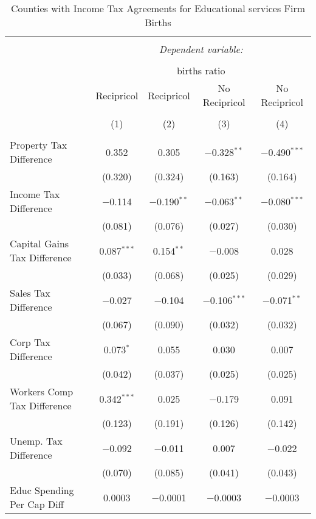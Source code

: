 
\begin{table}[!htbp] \centering 
  \caption{Counties with Income Tax Agreements for  Educational services Firm Births} 
  \label{61rd} 
\begin{tabular}{@{\extracolsep{5pt}}lcccc} 
\\[-1.8ex]\hline 
\hline \\[-1.8ex] 
 & \multicolumn{4}{c}{\textit{Dependent variable:}} \\ 
\cline{2-5} 
\\[-1.8ex] & \multicolumn{4}{c}{births ratio} \\ 
 & Recipricol & Recipricol & No Recipricol & No Recipricol \\ 
\\[-1.8ex] & (1) & (2) & (3) & (4)\\ 
\hline \\[-1.8ex] 
 Property Tax Difference & 0.352 & 0.305 & $-$0.328$^{**}$ & $-$0.490$^{***}$ \\ 
  & (0.320) & (0.324) & (0.163) & (0.164) \\ 
  Income Tax Difference & $-$0.114 & $-$0.190$^{**}$ & $-$0.063$^{**}$ & $-$0.080$^{***}$ \\ 
  & (0.081) & (0.076) & (0.027) & (0.030) \\ 
  Capital Gains Tax Difference & 0.087$^{***}$ & 0.154$^{**}$ & $-$0.008 & 0.028 \\ 
  & (0.033) & (0.068) & (0.025) & (0.029) \\ 
  Sales Tax Difference & $-$0.027 & $-$0.104 & $-$0.106$^{***}$ & $-$0.071$^{**}$ \\ 
  & (0.067) & (0.090) & (0.032) & (0.032) \\ 
  Corp Tax Difference & 0.073$^{*}$ & 0.055 & 0.030 & 0.007 \\ 
  & (0.042) & (0.037) & (0.025) & (0.025) \\ 
  Workers Comp Tax Difference & 0.342$^{***}$ & 0.025 & $-$0.179 & 0.091 \\ 
  & (0.123) & (0.191) & (0.126) & (0.142) \\ 
  Unemp. Tax Difference & $-$0.092 & $-$0.011 & 0.007 & $-$0.022 \\ 
  & (0.070) & (0.085) & (0.041) & (0.043) \\ 
  Educ Spending Per Cap Diff & 0.0003 & $-$0.0001 & $-$0.0003 & $-$0.0003 \\ 

\end{tabular}
\end{table}
